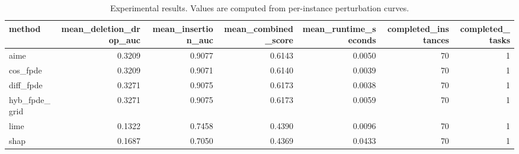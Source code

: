 \begin{table}[t]
\caption{Experimental results. Values are computed from per-instance perturbation curves.}
\label{tab:main_results_computed}
\centering
\begin{tabular}{lrrrrrr}
\toprule
method & mean\_deletion\_drop\_auc & mean\_insertion\_auc & mean\_combined\_score & mean\_runtime\_seconds & completed\_instances & completed\_tasks \\
\midrule
aime & 0.3209 & 0.9077 & 0.6143 & 0.0050 & 70 & 1 \\
cos\_fpde & 0.3209 & 0.9071 & 0.6140 & 0.0039 & 70 & 1 \\
diff\_fpde & 0.3271 & 0.9075 & 0.6173 & 0.0038 & 70 & 1 \\
hyb\_fpde\_grid & 0.3271 & 0.9075 & 0.6173 & 0.0059 & 70 & 1 \\
lime & 0.1322 & 0.7458 & 0.4390 & 0.0096 & 70 & 1 \\
shap & 0.1687 & 0.7050 & 0.4369 & 0.0433 & 70 & 1 \\
\bottomrule
\end{tabular}

\end{table}

